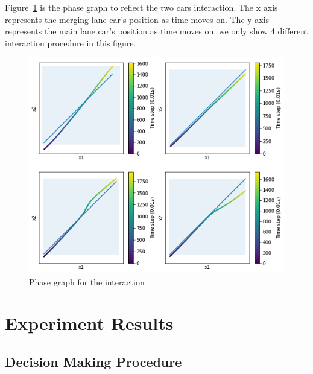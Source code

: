\documentclass[conference]{IEEEtran}
\begin{document}
Figure~\ref{fig:phase} is the phase graph to reflect the two cars interaction. The x axis represents the merging lane car's position as time moves on. The y axis represents the main lane car's position as time moves on. we only show 4 different interaction procedure in this figure.
\begin{figure}[h]
	\centering
	\includegraphics[scale = 0.35]{phase.png}
	\caption{Phase graph for the interaction}
	\label{fig:phase}
\end{figure}


\section{Experiment Results}
\subsection{Decision Making Procedure}
\end{document}

